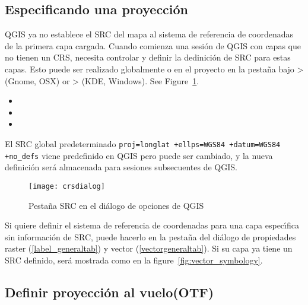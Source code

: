 \subsection{Especificando una proyecci\'on}
\label{sec:projection-specifying}

QGIS ya no establece el SRC del mapa al sistema de referencia de coordenadas de la
primera capa cargada. Cuando comienza una sesi\'on de QGIS con capas que no tienen
un CRS, necesita controlar y definir la dedinici\'on de SRC para estas
capas. Esto puede ser realizado globalmente o en el proyecto en la pesta\~na  bajo
 >  (Gnome, OSX) 
or  >  (KDE, Windows). 
See Figure~\ref{fig:crsdialog}. 

\begin{itemize}
\item {} 
\item {}
\item {}
\end{itemize}

El SRC global predeterminado \texttt{proj=longlat +ellps=WGS84 +datum=WGS84
+no\_defs} viene predefinido en QGIS pero puede ser cambiado, y la nueva definici\'on
ser\'a almacenada para sesiones subsecuentes de QGIS.    

\begin{figure}[ht]
   \begin{center}
   \caption{Pesta\~na SRC en el di\'alogo de opciones de QGIS \nixcaption}\label{fig:crsdialog}\smallskip
   \texttt{[image: crsdialog]}
\end{center}
\end{figure}

Si quiere definir el sistema de referencia de coordenadas para una capa espec\'{\i}fica
sin informaci\'on de SRC, puede hacerlo en la pesta\~na  del
di\'alogo de propiedades raster (\ref{label_generaltab}) y vector (\ref{vectorgeneraltab}).  
Si su capa ya tiene un SRC definido, ser\'a
mostrada como en la figure~\ref{fig:vector_symbology}.

\subsection{Definir proyecci\'on al vuelo(OTF)}\label{label_projstart}

